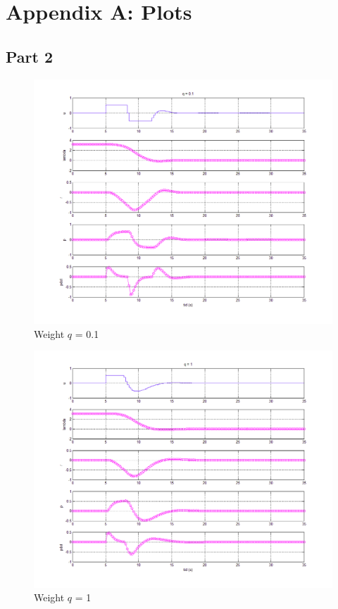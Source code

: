 \documentclass[a4paper, 12pt]{article}\usepackage[utf8]{inputenc}
\begin{document}
\newpage

\section{Appendix A: Plots}
\subsection{Part 2}

\begin{figure}[H]
    \centering
    \includegraphics[width=150mm]{Part2/q_lik_0_komma_1.png}
    \caption{Weight $q$ = 0.1}
    \label{fig:plot_2.3_1}
\end{figure}

\begin{figure}[H]
    \centering
    \includegraphics[width=150mm]{Part2/q_lik_1.png}
    \caption{Weight $q$ = 1}
    \label{fig:plot_2.3_2}
\end{figure}
\end{document}
